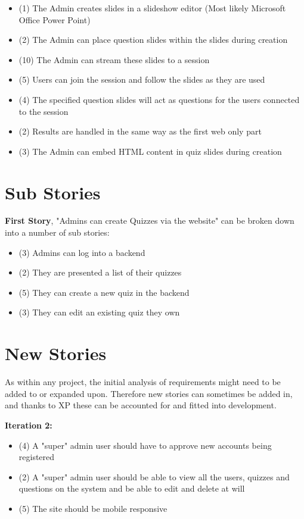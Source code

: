 \documentclass{article}
\begin{document}
\begin{itemize}
	\item (1) The Admin creates slides in a slideshow editor (Most likely Microsoft Office Power Point)
	\item (2) The Admin can place question slides within the slides during creation
	\item (10) The Admin can stream these slides to a session
	\item (5) Users can join the session and follow the slides as they are used	
	\item (4) The specified question slides will act as questions for the users connected to the session
	\item (2) Results are handled in the same way as the first web only part
	\item (3) The Admin can embed HTML content in quiz slides during creation
\end{itemize}
\newpage

\section{Sub Stories}
\textbf{First Story}, "Admins can create Quizzes via the website" can be broken down into a number of sub stories:
\begin{itemize}
	\item (3) Admins can log into a backend
	\item (2) They are presented a list of their quizzes
	\item (5) They can create a new quiz in the backend
	\item (3) They can edit an existing quiz they own
\end{itemize}
\newpage

\section{New Stories}
As within any project, the initial analysis of requirements might need to be added to or expanded upon. Therefore new stories can sometimes be added in, and thanks to XP these can be accounted for and fitted into development.

\textbf{Iteration 2:}
\begin{itemize}
	\item (4) A "super" admin user should have to approve new accounts being registered
	\item (2) A "super" admin user should be able to view all the users, quizzes and questions on the system and be able to edit and delete at will
	\item (5) The site should be mobile responsive
\end{itemize}
\end{document}
